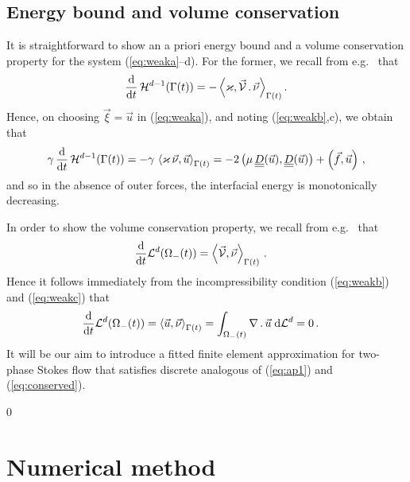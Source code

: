 \documentclass[a4paper,12pt,onecolumn]{article}
\newcommand{\vol}{\mathcal{L}^d}
\newcommand{\dL}[1]{\;{\rm d}{\cal L}^{#1}} %
\newcommand{\ddt}{\frac{\rm d}{{\rm d}t}}
\newcommand{\mat}[1]{\underline{\underline{#1}}\rule{0pt}{0pt}}
\begin{document}
\subsection{Energy bound and volume conservation}
It is straightforward to show an a priori energy bound and a volume
conservation property for the system (\ref{eq:weaka}--d). For the former, we
recall from e.g.\ \cite[Lemma~2.1]{DeckelnickDE05} that
\begin{equation}\label{eq:dtarea}
\ddt\,\mathcal{H}^{d-1}(\Gamma(t)) = -
\left\langle \varkappa, \vec{\mathcal{V}}\,.\,\vec\nu \right\rangle_{\Gamma(t)}. 
\end{equation}
Hence, on choosing $\vec\xi = \vec u$ in (\ref{eq:weaka}), and noting
(\ref{eq:weakb},c), we obtain that
\begin{align}
\gamma\, \ddt\,\mathcal{H}^{d-1}(\Gamma(t)) = -
\gamma\,\left\langle \varkappa\,\vec\nu, \vec u\right\rangle_{\Gamma(t)} 
=  - 2\left(\mu\,\mat D(\vec u), \mat D(\vec u)\right) +
\left(\vec f, \vec u\right) \,,
\label{eq:ap1}
\end{align}
and so in the absence of outer forces, the interfacial energy is monotonically
decreasing.

In order to show the volume conservation property, we recall from e.g.\
\cite[Lemma~2.1]{DeckelnickDE05} that
\begin{align}
\ddt \vol(\Omega_-(t)) & = \left\langle \vec{\mathcal{V}}, \vec\nu 
\right\rangle_{\Gamma(t)}\,.
\end{align}
Hence it follows immediately from the incompressibility condition
(\ref{eq:weakb}) and (\ref{eq:weakc}) that
\begin{align}
\ddt \vol(\Omega_-(t)) & = \left\langle \vec u , \vec\nu
\right\rangle_{\Gamma(t)}
 = \int_{\Omega_-(t)} \nabla\,.\,\vec u \dL{d} =0\,. \label{eq:conserved}
\end{align}
It will be our aim to introduce a fitted finite element approximation for 
two-phase Stokes flow that satisfies discrete analogous of 
(\ref{eq:ap1}) and (\ref{eq:conserved}).

\setcounter{equation} 0
\section{Numerical method} \label{sec:3}
\end{document}
